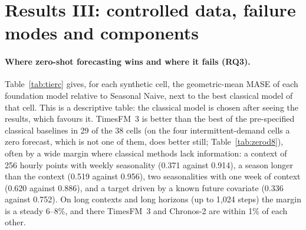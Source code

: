 \section{Results III: controlled data, failure modes and components}
\label{sec:controlled}

\paragraph{Where zero-shot forecasting wins and where it fails (RQ3).} Table~\ref{tab:tierc} gives, for each synthetic cell, the
geometric-mean MASE of each foundation model relative to Seasonal Naive, next to the best classical model of that cell. This is a
descriptive table: the classical model is chosen after seeing the results, which favours it. TimesFM~3 is better than the best of the
pre-specified classical baselines in 29 of the 38 cells (on the four intermittent-demand cells a zero forecast, which is not one of
them, does better still; Table~\ref{tab:zerod8}), often by a wide margin where classical methods lack information: a context of 256 hourly
points with weekly seasonality (0.371 against 0.914), a season longer than the context (0.519 against 0.956), two seasonalities
with one week of context (0.620 against 0.886), and a target driven by a known future covariate (0.336 against 0.752). On long
contexts and long horizons (up to 1{,}024 steps) the margin is a steady 6--8\%, and there TimesFM~3 and Chronos-2 are within 1\%
of each other.

